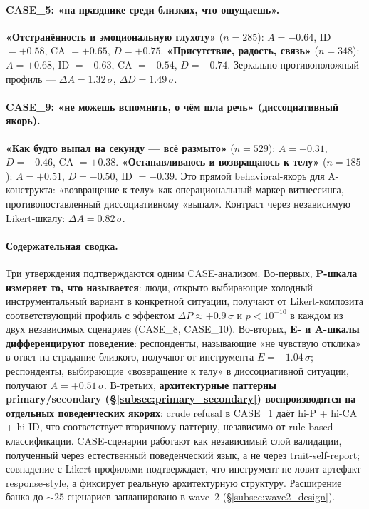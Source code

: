 \paragraph{CASE\_5: «на празднике среди близких, что ощущаешь».} \textbf{«Отстранённость и эмоциональную глухоту»} ($n = 285$): $A = -0.64$, ID $= +0.58$, CA $= +0.65$, $D = +0.75$. \textbf{«Присутствие, радость, связь»} ($n = 348$): $A = +0.68$, ID $= -0.63$, CA $= -0.54$, $D = -0.74$. Зеркально противоположный профиль --- $\Delta A = 1.32\,\sigma$, $\Delta D = 1.49\,\sigma$.

\paragraph{CASE\_9: «не можешь вспомнить, о чём шла речь» (диссоциативный якорь).} \textbf{«Как будто выпал на секунду --- всё размыто»} ($n = 529$): $A = -0.31$, $D = +0.46$, CA $= +0.38$. \textbf{«Останавливаюсь и возвращаюсь к телу»} ($n = 185$): $A = +0.51$, $D = -0.50$, ID $= -0.39$. Это прямой behavioral-якорь для A-конструкта: «возвращение к телу» как операциональный маркер витнессинга, противопоставленный диссоциативному «выпал». Контраст через независимую Likert-шкалу: $\Delta A = 0.82\,\sigma$.

\paragraph{Содержательная сводка.} Три утверждения подтверждаются одним CASE-анализом. Во-первых, \textbf{P-шкала измеряет то, что называется}: люди, открыто выбирающие холодный инструментальный вариант в конкретной ситуации, получают от Likert-композита соответствующий профиль с эффектом $\Delta P \approx +0.9\,\sigma$ и $p < 10^{-10}$ в каждом из двух независимых сценариев (CASE\_8, CASE\_10). Во-вторых, \textbf{E- и A-шкалы дифференцируют поведение}: респонденты, называющие «не чувствую отклика» в ответ на страдание близкого, получают от инструмента $E = -1.04\,\sigma$; респонденты, выбирающие «возвращение к телу» в диссоциативной ситуации, получают $A = +0.51\,\sigma$. В-третьих, \textbf{архитектурные паттерны primary/secondary (§\ref{subsec:primary_secondary}) воспроизводятся на отдельных поведенческих якорях}: crude refusal в CASE\_1 даёт hi-P + hi-CA + hi-ID, что соответствует вторичному паттерну, независимо от rule-based классификации. CASE-сценарии работают как независимый слой валидации, полученный через естественный поведенческий язык, а не через trait-self-report; совпадение с Likert-профилями подтверждает, что инструмент не ловит артефакт response-style, а фиксирует реальную архитектурную структуру. Расширение банка до $\sim 25$ сценариев запланировано в wave~2 (§\ref{subsec:wave2_design}).


